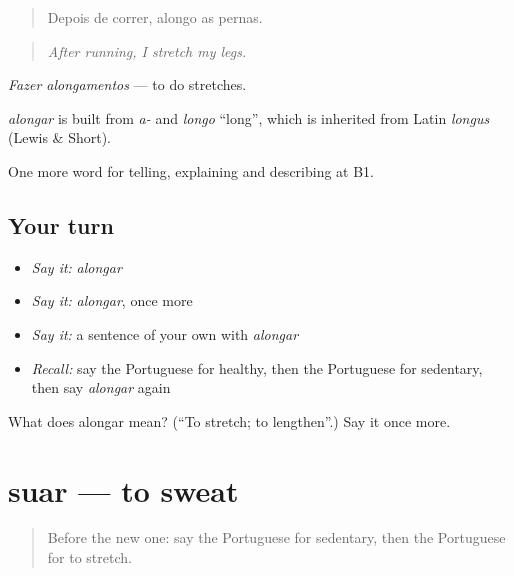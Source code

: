 \begin{quote}
Depois de correr, alongo as pernas.
\end{quote}

\begin{quote}
\emph{After running, I stretch my legs.}
\end{quote}

\emph{Fazer alongamentos} — to do stretches.

\begin{cousinweb}
\emph{alongar} is built from \emph{a-} and \emph{longo} \textquotedblleft{}long\textquotedblright{}, which is inherited from Latin \emph{longus} (Lewis \& Short).
\end{cousinweb}

\begin{grammarlens}[title={What you've built}]
One more word for telling, explaining and describing at B1.
\end{grammarlens}

\subsection*{Your turn}
\begin{itemize}
\raggedright
  \item \emph{Say it:} \emph{alongar}
  \item \emph{Say it:} \emph{alongar}, once more
  \item \emph{Say it:} a sentence of your own with \emph{alongar}
  \item \emph{Recall:} say the Portuguese for healthy, then the Portuguese for sedentary, then say \emph{alongar} again
\end{itemize}

\begin{tcolorbox}[breakable,colback=teal!4,colframe=teal!35!black,title={Before you move on}]
What does alongar mean? (\textquotedblleft{}To stretch; to lengthen\textquotedblright{}.) Say it once more.
\end{tcolorbox}
\section[suar]{suar — to sweat}

\label{lesson:PT-C490-suar}



\begin{quote}
Before the new one: say the Portuguese for sedentary, then the Portuguese for to stretch.
\end{quote}

